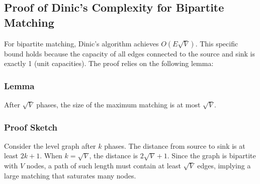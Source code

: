 \documentclass[12pt,a4paper]{article}
\begin{document}
\begin{table}[H]
\centering
\caption{Detailed Time and Space Complexity Analysis}
\label{tab:detailed_complexity}
\end{table}

\subsection{Proof of Dinic's Complexity for Bipartite Matching}
For bipartite matching, Dinic's algorithm achieves \(O(E\sqrt{V})\). This specific bound holds because the capacity of all edges connected to the source and sink is exactly 1 (unit capacities). The proof relies on the following lemma:

\subsubsection{Lemma}
After \(\sqrt{V}\) phases, the size of the maximum matching is at most \(\sqrt{V}\).

\subsubsection{Proof Sketch}
Consider the level graph after \(k\) phases. The distance from source to sink is at least \(2k+1\). When \(k = \sqrt{V}\), the distance is \(2\sqrt{V}+1\). Since the graph is bipartite with \(V\) nodes, a path of such length must contain at least \(\sqrt{V}\) edges, implying a large matching that saturates many nodes.
\end{document}
